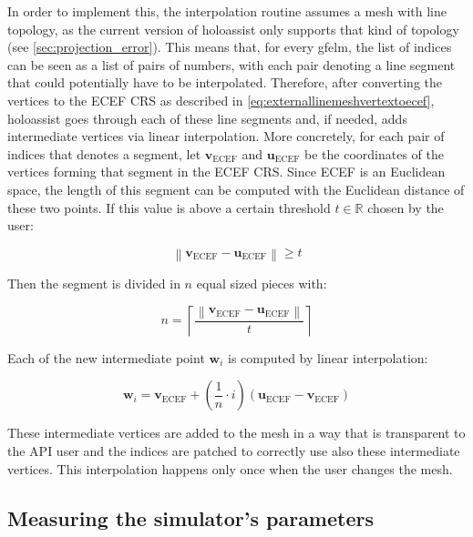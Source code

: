 In order to implement this, the interpolation routine assumes a mesh with line topology, as the current version of \gls{holoassist} only supports that kind of topology (see \autoref{sec:projection_error}). This means that, for every \gls{gfelm}, the list of indices can be seen as a list of pairs of numbers, with each pair denoting a line segment that could potentially have to be interpolated. Therefore, after converting the vertices to the \gls{ECEF} \gls{CRS} as described in \autoref{eq:externallinemeshvertextoecef}, \gls{holoassist} goes through each of these line segments and, if needed, adds intermediate vertices via linear interpolation. More concretely, for each pair of indices that denotes a segment, let $\mathbf{v}_{\text{ECEF}}$ and $\mathbf{u}_{\text{ECEF}}$ be the coordinates of the vertices forming that segment in the \gls{ECEF} \gls{CRS}. Since \gls{ECEF} is an Euclidean space, the length of this segment can be computed with the Euclidean distance of these two points. If this value is above a certain threshold $t \in \mathbb{R}$ chosen by the user:

\begin{equation}
    \left \lVert \mathbf{v}_{\text{ECEF}} - \mathbf{u}_{\text{ECEF}} \right \rVert \geq t
\end{equation}

Then the segment is divided in $n$ equal sized pieces with:

\begin{equation}
    n = \left\lceil \frac{\left\lVert \mathbf{v}_{\text{ECEF}} - \mathbf{u}_{\text{ECEF}}\right\rVert}{t} \right\rceil
\end{equation}

Each of the new intermediate point $\mathbf{w}_i$ is computed by linear interpolation:

\begin{equation}
    \mathbf{w}_i = \mathbf{v}_{\text{ECEF}} + \left(\frac{1}{n} \cdot i\right) \left(\mathbf{u}_{\text{ECEF}} - \mathbf{v}_{\text{ECEF}}\right)
\end{equation}

These intermediate vertices are added to the mesh in a way that is transparent to the \gls{API} user and the indices are patched to correctly use also these intermediate vertices. This interpolation happens only once when the user changes the mesh.

\subsection{Measuring the simulator's parameters}\label{sec:obtaining_rfs_measures}

